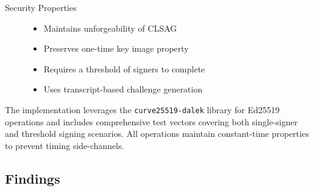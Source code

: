 \documentclass[12pt,a4paper]{article}
\begin{document}
\begin{description}
\item[Security Properties] \hfill  %
\begin{itemize}
\item Maintains unforgeability of CLSAG
\item Preserves one-time key image property
\item Requires a threshold of signers to complete
\item Uses transcript-based challenge generation
\end{itemize}
\end{description}

The implementation leverages the \texttt{\texttt{curve25519-dalek}} library for Ed25519 operations and includes comprehensive test vectors covering both single-signer and threshold signing scenarios.
All operations maintain constant-time properties to prevent timing side-channels.

\subsection{Findings}
\end{document}
